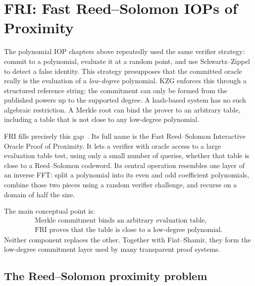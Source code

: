 \section{FRI: Fast Reed--Solomon IOPs of Proximity}
\label{sec:fri}

The polynomial IOP chapters above repeatedly used the same verifier strategy: commit to a
polynomial, evaluate it at a random point, and use Schwartz--Zippel to detect a false identity.
This strategy presupposes that the committed oracle really is the evaluation of a
\emph{low-degree} polynomial. KZG enforces this through a structured reference string: the
commitment can only be formed from the published powers up to the supported degree. A
hash-based system has no such algebraic restriction. A Merkle root can bind the prover to an
arbitrary table, including a table that is not close to any low-degree polynomial.

FRI fills precisely this gap~\cite{BenSassonBentovHoreshRiabzev2018FRI}. Its full name is
the Fast Reed--Solomon Interactive Oracle Proof of Proximity. It lets a verifier with oracle
access to a large evaluation table test, using only a small number of queries, whether that
table is close to a Reed--Solomon codeword. Its central operation resembles one layer of an inverse FFT:
split a polynomial into its even and odd coefficient polynomials, combine those two pieces
using a random verifier challenge, and recurse on a domain of half the size.

The main conceptual point is:
\[
\boxed{
\begin{array}{c}
\text{Merkle commitment binds an arbitrary evaluation table,}\\[0.2em]
\text{FRI proves that the table is close to a low-degree polynomial.}
\end{array}}
\]
Neither component replaces the other. Together with Fiat--Shamir, they form the low-degree
commitment layer used by many transparent proof systems.

\subsection{The Reed--Solomon proximity problem}

